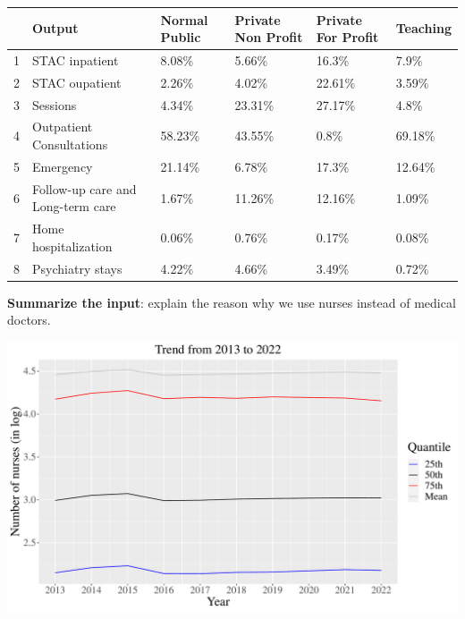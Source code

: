 \documentclass[12pt]{article}
\begin{document}
\begin{adjustbox}{width=1\textwidth}
    \begin{tabular}{rlllll}
        \toprule
          & Output                            & Normal Public & Private Non Profit & Private For Profit & Teaching \\
        \midrule
        1 & STAC inpatient                    & 8.08\%        & 5.66\%             & 16.3\%             & 7.9\%    \\
        2 & STAC oupatient                    & 2.26\%        & 4.02\%             & 22.61\%            & 3.59\%   \\
        3 & Sessions                          & 4.34\%        & 23.31\%            & 27.17\%            & 4.8\%    \\
        4 & Outpatient Consultations          & 58.23\%       & 43.55\%            & 0.8\%              & 69.18\%  \\
        5 & Emergency                         & 21.14\%       & 6.78\%             & 17.3\%             & 12.64\%  \\
        6 & Follow-up care and Long-term care & 1.67\%        & 11.26\%            & 12.16\%            & 1.09\%   \\
        7 & Home hospitalization              & 0.06\%        & 0.76\%             & 0.17\%             & 0.08\%   \\
        8 & Psychiatry stays                  & 4.22\%        & 4.66\%             & 3.49\%             & 0.72\%   \\
        \bottomrule
    \end{tabular}
\end{adjustbox}

\textbf{Summarize the input}: explain the reason why we use nurses instead of medical doctors.

\begin{adjustbox}{width=1\textwidth}
    \includegraphics{../../Figures/Descriptive/nurses.pdf}
\end{adjustbox}
\end{document}
